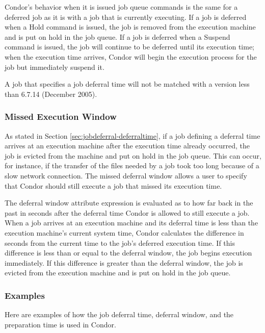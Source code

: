 Condor's behavior when it is issued job queue commands
is the same for a deferred job as it is with a job
that is currently executing.
If a job is deferred when a Hold command is issued,
the job is removed from the execution machine and is put on
hold in the job queue.
If a job is deferred when a Suspend command is issued,
the job will continue to be deferred until its execution time;
when the execution time arrives,
Condor will begin the execution process for the job but immediately suspend it.

A job that specifies a job deferral time will not be matched
with a  version less than 6.7.14 (December 2005).

\subsubsection{Missed Execution Window}
\label{sec:jobdeferral-deferralwindow}

As stated in Section \ref{sec:jobdeferral-deferraltime},
if a job defining a deferral time arrives at an execution machine
after the execution time already occurred,
the job is evicted from the machine and put on hold in the job queue.
This can occur, for instance,
if the transfer of the files needed by a job took too long
because of a slow network connection.
The missed deferral window allows a user to specify that Condor
should still execute a job that missed its execution time.

The deferral window attribute expression is evaluated
as to how far back in the past in seconds after the deferral time
Condor is allowed to still execute a job.
When a job arrives at an execution machine and its deferral time
is less than the execution machine's current system time,
Condor calculates the difference in seconds
from the current time to the job's deferred execution time.
If this difference is less than or equal to the deferral window,
the job begins execution immediately.
If this difference is greater than the deferral window,
the job is evicted from the execution machine
and is put on hold in the job queue.

\subsubsection{Examples}
\label{sec:jobdeferral-examples}
Here are examples of how the job deferral time,
deferral window, and the preparation time is used in Condor.

